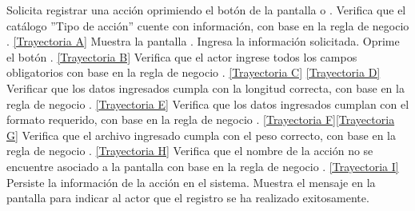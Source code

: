 \begin{UCtrayectoria}
	\UCpaso[\UCactor] Solicita registrar una acción oprimiendo el botón  de la pantalla  o .
	\UCpaso[\UCsist] Verifica que el catálogo ''Tipo de acción'' cuente con información, con base en la regla de negocio . \hyperlink{CU11-1-1-1:TAA}{[Trayectoria A]}
	\UCpaso[\UCsist] Muestra la pantalla .
	\UCpaso[\UCactor] Ingresa la información solicitada. \label{CU11.1.1-P3}
	\UCpaso[\UCactor] Oprime el botón . \hyperlink{CU11-1-1-1:TAB}{[Trayectoria B]} 
	\UCpaso[\UCsist] Verifica que el actor ingrese todos los campos obligatorios con base en la regla de negocio . \hyperlink{CU11-1-1-1:TAC}{[Trayectoria C]} \hyperlink{CU11-1-1-1:TAD}{[Trayectoria D]}
	\UCpaso[\UCsist] Verificar que los datos ingresados cumpla con la longitud correcta, con base en la regla de negocio . \hyperlink{CU11-1-1-1:TAE}{[Trayectoria E]}
	\UCpaso[\UCsist] Verifica que los datos ingresados cumplan con el formato requerido, con base en la regla de negocio . \hyperlink{CU11-1-1-1:TAF}{[Trayectoria F]}\hyperlink{CU11-1-1-1:TAG}{[Trayectoria G]}
	\UCpaso[\UCsist] Verifica que el archivo ingresado cumpla con el peso correcto, con base en la regla de negocio . \hyperlink{CU11-1-1-1:TAH}{[Trayectoria H]}
	\UCpaso[\UCsist] Verifica que el nombre de la acción no se encuentre asociado a la pantalla con base en la regla de negocio . \hyperlink{CU11-1-1-1:TAI}{[Trayectoria I]}
	\UCpaso[\UCsist] Persiste la información de la acción en el sistema.
	\UCpaso[\UCsist] Muestra el mensaje  en la pantalla  para indicar al actor que el registro se ha realizado exitosamente.
\end{UCtrayectoria}		

